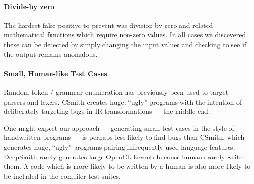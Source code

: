 \paragraph{Divide-by zero}  The hardest false-positive to prevent was division by zero and related mathematical functions which require non-zero values. In all cases we discovered these can be detected by simply changing the input values and checking to see if the output remains anomalous.


\paragraph{Small, Human-like Test Cases} Random token / grammar enumeration has previously been used to target parsers and lexers. CSmith creates huge, ``ugly'' programs with the intention of deliberately targeting bugs in IR transformations --- the middle-end.

One might expect our approach --- generating small test cases in the style of handwritten programs --- is perhaps less likely to find bugs than CSmith, which generates huge, ``ugly'' programs pairing infrequently used language features. DeepSmith rarely generates large OpenCL kernels because humans rarely write them. A code which is more likely to be written by a human is also more likely to be included in the compiler test suites, 